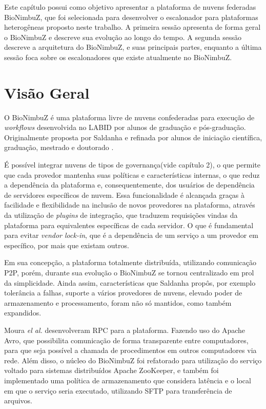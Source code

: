 Este capítulo possui como objetivo apresentar a plataforma de nuvens federadas BioNimbuZ, que foi selecionada para desenvolver o escalonador para plataformas heterogêneas proposto neste trabalho. A primeira sessão apresenta de forma geral o BioNimbuZ e descreve sua evolução ao longo do tempo. A segunda sessão descreve a arquitetura do BioNimbuZ, e suas principais partes, enquanto a última sessão foca sobre os escalonadores que existe atualmente no BioNimbuZ.

\section{Visão Geral}

O BioNimbuZ é uma plataforma livre de nuvens confederadas para execução de \textit{workflows} desenvolvida no \acrfull{LABID} por alunos de graduação e pós-graduação. Originalmente proposta por Saldanha\cite{Saldanha_BioNimbus} e refinada por alunos de iniciação científica, graduação, mestrado e doutorado\cite{closer12_BioNimbuZ_AHP}\cite{BioNimbuZ_6846526} \cite{6732620_BioNimbuZ_ACOsched}\cite{BioNimbuZ_Breno_Deric}\cite{BioNimbuZ_Vegara}\cite{BioNimbuZ_Willian_C99}.

É possível integrar nuvens de tipos de governança(vide capítulo 2), o que permite que cada provedor mantenha suas políticas e características internas, o que reduz a dependência da plataforma e, consequentemente, dos usuários de dependência de servidores específicos de nuvem. Essa funcionalidade é alcançada graças à facilidade e flexibilidade na inclusão de novos provedores na plataforma, através da utilização de \textit{plugins} de integração, que traduzem requisições vindas da plataforma para equivalentes específicas de cada servidor. O que é fundamental para evitar \textit{vendor lock-in}, que é a dependência de um serviço a um provedor em específico, por mais que existam outros.

Em sua concepção, a plataforma totalmente distribuída, utilizando comunicação \acrfull{P2P}, porém, durante sua evolução o BioNimbuZ se tornou centralizado em prol da simplicidade. Ainda assim, características que Saldanha propôs\cite{Saldanha_BioNimbus}, por exemplo tolerância a falhas, suporte a vários provedores de nuvens, elevado poder de armazenamento e processamento, foram não só mantidos, como também expandidos.

Moura \textit{el al.}\cite{BioNimbuZ_6846526} desenvolveram \acrfull{RPC}\cite{RPC_1701928} para a plataforma. Fazendo uso do Apache Avro\cite{Avro}, que possibilita comunicação de forma transparente entre computadores, para que seja possível a chamada de procedimentos em outros computadores via rede. Além disso, o núcleo do BioNimbuZ foi refatorado para utilização do serviço voltado para sistemas distribuídos Apache ZooKeeper\cite{Zookeeper}, e também foi implementado uma política de armazenamento que considera latência e o local em que o serviço seria executado, utilizando \acrfull{SFTP} para transferência de arquivos.

